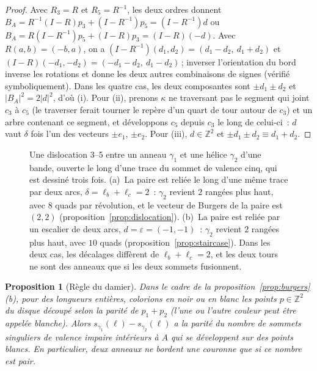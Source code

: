\documentclass[11pt,a4paper]{article}
\newtheorem{proposition}{Proposition}
\newcommand{\Z}{\mathbb{Z}}
\newcommand{\shift}{s}
\begin{document}
\begin{proof}
Avec $R_3 = R$ et $R_5 = R^{-1}$, les deux ordres donnent $B_A = R^{-1}(I -
R)p_3 + (I - R^{-1})p_5 = (I - R^{-1})d$ ou $B_A = R(I - R^{-1})p_5 + (I -
R)p_3 = (I - R)(-d)$. Avec $R(a, b) = (-b, a)$, on a $(I - R^{-1})(d_1, d_2) =
(d_1 - d_2,\ d_1 + d_2)$ et $(I - R)(-d_1, -d_2) = (-d_1 - d_2,\ d_1 -
d_2)$\,; inverser l'orientation du bord inverse les rotations et donne les
deux autres combinaisons de signes (vérifié symboliquement). Dans les quatre
cas, les deux composantes sont $\pm d_1 \pm d_2$ et $|B_A|^2 = 2|d|^2$, d'où
(i). Pour (ii), prenons $\kappa$ ne traversant pas le segment qui joint $c_3$
à $c_5$ (le traverser ferait tourner le repère d'un quart de tour autour de
$c_3$) et un arbre contenant ce segment, et développons $c_5$ depuis $c_3$ le
long de celui-ci~: $d$ vaut $\delta$ fois l'un des vecteurs $\pm e_1$, $\pm
e_2$. Pour (iii), $d \in \Z^2$ et $\pm d_1 \pm d_2 \equiv d_1 + d_2$.
\end{proof}

\begin{figure}[t]
\centering

\caption{Une dislocation 3--5 entre un anneau $\gamma_1$ et une hélice
$\gamma_2$ d'une bande, ouverte le long d'une trace du sommet de valence cinq,
qui est dessiné trois fois. (a)~La paire est reliée le long d'une même trace
par deux arcs, $\delta = \ell_b + \ell_c = 2$~: $\gamma_2$ revient $2$ rangées
plus haut, avec $8$ quads par révolution, et le vecteur de Burgers de la paire
est $(2, 2)$ (proposition~\ref{prop:dislocation}). (b)~La paire est reliée
par un escalier de deux arcs, $d = \varepsilon = (-1, -1)$~: $\gamma_2$
revient $2$ rangées plus haut, avec $10$ quads
(proposition~\ref{prop:staircase}). Dans les deux cas, les décalages
diffèrent de $\ell_b + \ell_c = 2$, et les deux tours ne sont des anneaux que
si les deux sommets fusionnent.}
\label{fig:dislocation}
\end{figure}

\begin{proposition}[Règle du damier]\label{prop:checkerboard}
Dans le cadre de la proposition~\ref{prop:burgers}(b), pour des longueurs
entières, colorions en noir ou en blanc les points $p \in \Z^2$ du disque
découpé selon la parité de $p_1 + p_2$ (l'une ou l'autre couleur peut être
appelée blanche). Alors $\shift_{\gamma_1}(\ell) - \shift_{\gamma_2}(\ell)$ a
la parité du nombre de sommets singuliers de valence impaire intérieurs à $A$
qui se développent sur des points blancs. En particulier, deux anneaux ne
bordent une couronne que si ce nombre est pair.
\end{proposition}
\end{document}
